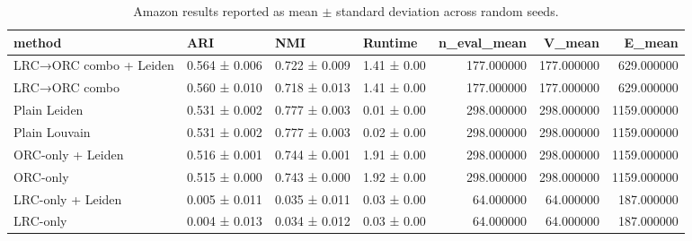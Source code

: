 \begin{table}
\caption{Amazon results reported as mean $\pm$ standard deviation across random seeds.}
\label{tab:amazon_mean_std}
\begin{tabular}{llllrrr}
\toprule
method & ARI & NMI & Runtime & n_eval_mean & V_mean & E_mean \\
\midrule
LRC→ORC combo + Leiden & 0.564 ± 0.006 & 0.722 ± 0.009 & 1.41 ± 0.00 & 177.000000 & 177.000000 & 629.000000 \\
LRC→ORC combo & 0.560 ± 0.010 & 0.718 ± 0.013 & 1.41 ± 0.00 & 177.000000 & 177.000000 & 629.000000 \\
Plain Leiden & 0.531 ± 0.002 & 0.777 ± 0.003 & 0.01 ± 0.00 & 298.000000 & 298.000000 & 1159.000000 \\
Plain Louvain & 0.531 ± 0.002 & 0.777 ± 0.003 & 0.02 ± 0.00 & 298.000000 & 298.000000 & 1159.000000 \\
ORC-only + Leiden & 0.516 ± 0.001 & 0.744 ± 0.001 & 1.91 ± 0.00 & 298.000000 & 298.000000 & 1159.000000 \\
ORC-only & 0.515 ± 0.000 & 0.743 ± 0.000 & 1.92 ± 0.00 & 298.000000 & 298.000000 & 1159.000000 \\
LRC-only + Leiden & 0.005 ± 0.011 & 0.035 ± 0.011 & 0.03 ± 0.00 & 64.000000 & 64.000000 & 187.000000 \\
LRC-only & 0.004 ± 0.013 & 0.034 ± 0.012 & 0.03 ± 0.00 & 64.000000 & 64.000000 & 187.000000 \\
\bottomrule
\end{tabular}
\end{table}
